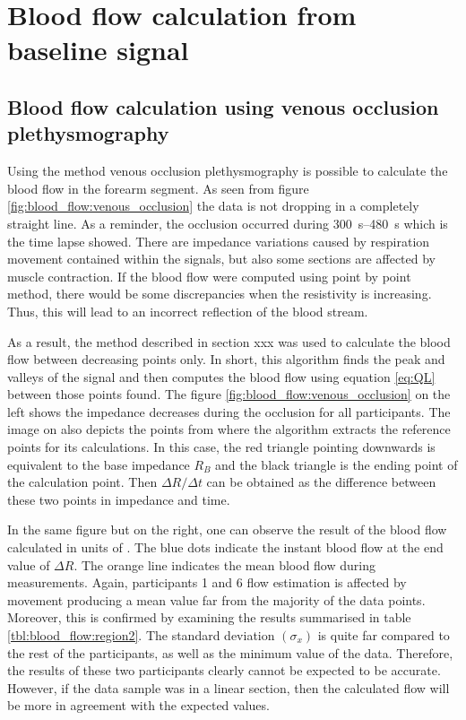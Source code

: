 \pagebreak
\section{Blood flow calculation from baseline signal}
\label{section results 4}

\subsection{Blood flow calculation using venous occlusion plethysmography}
\label{section results 4.1}
Using the method venous occlusion plethysmography is possible to calculate the blood flow in the forearm segment. As seen from figure \ref{fig:blood_flow:venous_occlusion} the data is not dropping in a completely straight line. As a reminder, the occlusion occurred during \SIrange{300}{480}{\second} which is the time lapse showed. There are impedance variations caused by respiration movement contained within the signals, but also some sections are affected by muscle contraction. If the blood flow were computed using point by point method, there would be some discrepancies when the resistivity is increasing. Thus, this will lead to an incorrect reflection of the blood stream. 

As a result, the method described in section xxx was used to calculate the blood flow between decreasing points only. In short, this algorithm finds the peak and valleys of the signal and then computes the blood flow using equation \ref{eq:QL} between those points found. The figure \ref{fig:blood_flow:venous_occlusion} on the left shows the impedance decreases during the occlusion for all participants. The image on  also depicts the points from where the algorithm extracts the reference points for its calculations. In this case, the red triangle pointing downwards is equivalent to the base impedance $R_B$ and the black triangle is the ending point of the calculation point. Then $\Delta R / \Delta t$ can be obtained as the difference between these two points in impedance and time. 

In the same figure but on the right, one can observe the result of the blood flow calculated in units of \si{\bfv}. The blue dots indicate the instant blood flow at the end value of $\Delta R$. The orange line indicates the mean blood flow during measurements. Again, participants 1 and 6 flow estimation is affected by movement producing a mean value far from the majority of the data points. Moreover, this is confirmed by examining the results summarised in table \ref{tbl:blood_flow:region2}. The standard deviation $(\sigma_x)$ is quite far compared to the rest of the participants, as well as the minimum value of the data. Therefore, the results of these two participants clearly cannot be expected to be accurate. However, if the data sample was in a linear section, then the calculated flow will be more in agreement with the expected values. 

